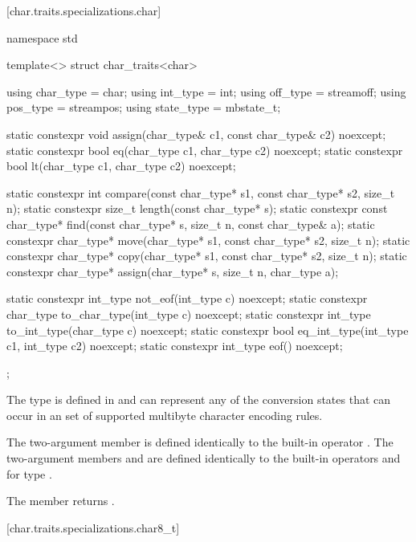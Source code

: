 [char.traits.specializations.char]{}

%
\begin{codeblock}
namespace std {
  template<> struct char_traits<char> {
    using char_type  = char;
    using int_type   = int;
    using off_type   = streamoff;
    using pos_type   = streampos;
    using state_type = mbstate_t;

    static constexpr void assign(char_type& c1, const char_type& c2) noexcept;
    static constexpr bool eq(char_type c1, char_type c2) noexcept;
    static constexpr bool lt(char_type c1, char_type c2) noexcept;

    static constexpr int compare(const char_type* s1, const char_type* s2, size_t n);
    static constexpr size_t length(const char_type* s);
    static constexpr const char_type* find(const char_type* s, size_t n,
                                           const char_type& a);
    static constexpr char_type* move(char_type* s1, const char_type* s2, size_t n);
    static constexpr char_type* copy(char_type* s1, const char_type* s2, size_t n);
    static constexpr char_type* assign(char_type* s, size_t n, char_type a);

    static constexpr int_type not_eof(int_type c) noexcept;
    static constexpr char_type to_char_type(int_type c) noexcept;
    static constexpr int_type to_int_type(char_type c) noexcept;
    static constexpr bool eq_int_type(int_type c1, int_type c2) noexcept;
    static constexpr int_type eof() noexcept;
  };
}
\end{codeblock}

\pnum
The type
is defined in
and can represent any of the conversion states that can occur in an
 set of supported multibyte
character encoding rules.

\pnum
The two-argument member  is defined identically to the
built-in operator \tcode{=}. The two-argument members 
and  are defined identically to the built-in operators
\tcode{==} and \tcode{<} for type .

\pnum
The member
returns
.

[char.traits.specializations.char8_t]{}

